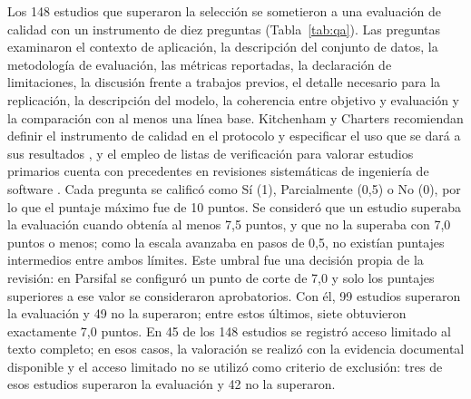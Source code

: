 \documentclass[pdflatex,sn-mathphys-num]{sn-jnl}%
\theoremstyle{thmstyleone}%
\theoremstyle{thmstyletwo}%
\theoremstyle{thmstylethree}%
\begin{document}
Los 148 estudios que superaron la selección se sometieron a una evaluación de calidad con un instrumento de diez preguntas (Tabla~\ref{tab:qa}). Las preguntas examinaron el contexto de aplicación, la descripción del conjunto de datos, la metodología de evaluación, las métricas reportadas, la declaración de limitaciones, la discusión frente a trabajos previos, el detalle necesario para la replicación, la descripción del modelo, la coherencia entre objetivo y evaluación y la comparación con al menos una línea base. Kitchenham y Charters recomiendan definir el instrumento de calidad en el protocolo y especificar el uso que se dará a sus resultados \cite{kitchenham2007}, y el empleo de listas de verificación para valorar estudios primarios cuenta con precedentes en revisiones sistemáticas de ingeniería de software \cite{dyba2008}. Cada pregunta se calificó como Sí (1), Parcialmente (0,5) o No (0), por lo que el puntaje máximo fue de 10 puntos. Se consideró que un estudio superaba la evaluación cuando obtenía al menos 7,5 puntos, y que no la superaba con 7,0 puntos o menos; como la escala avanzaba en pasos de 0,5, no existían puntajes intermedios entre ambos límites. Este umbral fue una decisión propia de la revisión: en Parsifal se configuró un punto de corte de 7,0 y solo los puntajes superiores a ese valor se consideraron aprobatorios. Con él, 99 estudios superaron la evaluación y 49 no la superaron; entre estos últimos, siete obtuvieron exactamente 7,0 puntos. En 45 de los 148 estudios se registró acceso limitado al texto completo; en esos casos, la valoración se realizó con la evidencia documental disponible y el acceso limitado no se utilizó como criterio de exclusión: tres de esos estudios superaron la evaluación y 42 no la superaron.
\end{document}
